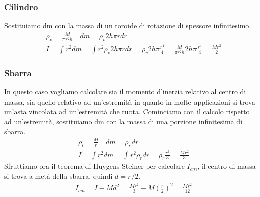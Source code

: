 \subsubsection*{Cilindro}
Sostituiamo dm con la massa di un toroide di rotazione di spessore infinitesimo.
\begin{align*}
	&\rho_v = \frac{M}{\pi r^2 h} \quad dm = \rho_v 2 h \pi r dr\\
	&I = \int r^2 dm = \int r^2 \rho_v 2 h \pi r dr = \rho_v 2 h \pi \frac{r^4}{4}= \frac{M}{\pi r^2 h} 2 h \pi \frac{r^4}{4} = \frac{M r^2}{2}
\end{align*}
\subsubsection*{Sbarra}
In questo caso vogliamo calcolare sia il momento d'inerzia relativo al centro di massa, sia quello relativo ad un'estremità in quanto in molte applicazioni si trova un'asta vincolata ad un'estremità che ruota. Cominciamo con il calcolo rispetto ad un'estremità, sostituiamo dm con la massa di una porzione infinitesima di sbarra. 
\begin{align*}
	&\rho_l = \frac{M}{r} \quad dm = \rho_r dr\\
	&I = \int r^2 dm = \int r^2 \rho_r dr = \rho_r \frac{r^3}{3} = \frac{M r^2}{3}
\end{align*}
Sfruttiamo ora il teorema di Huygens-Steiner per calcolare $I_{cm}$, il centro di massa si trova a metà della sbarra, quindi $d = r/2$.
\begin{align*}
	&I_{cm} = I - M d^2 = \frac{M r^2}{3} - M (\frac{r}{2})^2 = \frac{M r^2}{12}
\end{align*}
